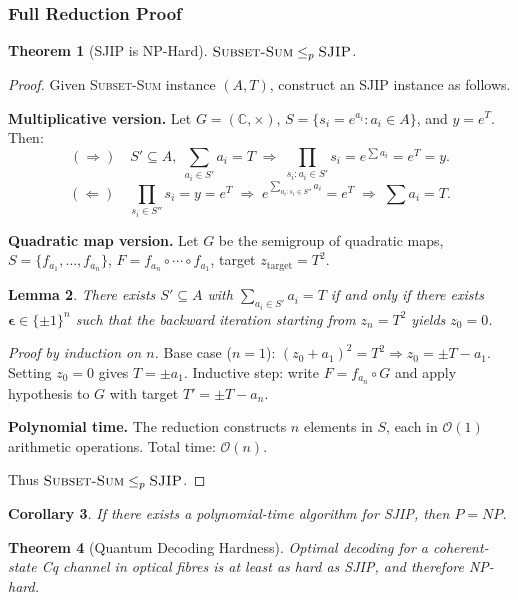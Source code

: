 \documentclass[12pt,a4paper]{article}
\theoremstyle{definition}
\theoremstyle{plain}
\newtheorem{theorem}{Theorem}[section]
\newtheorem{lemma}[theorem]{Lemma}
\newtheorem{corollary}[theorem]{Corollary}
\newcommand{\C}{\mathbb{C}}
\begin{document}
\subsubsection{Full Reduction Proof}

\begin{theorem}[SJIP is NP-Hard]
\label{thm:sjip_nphard}
$\textsc{Subset-Sum}\le_p\textsc{SJIP}$.
\end{theorem}

\begin{proof}
Given \textsc{Subset-Sum} instance $(A,T)$, construct an SJIP instance as follows.

\textbf{Multiplicative version.} Let $G=(\C,\times)$, $S=\{s_i=e^{a_i}:a_i\in A\}$,
and $y=e^T$. Then:
\[
(\Rightarrow)\quad S'\subseteq A,\;\sum_{a_i\in S'}a_i=T\;\Longrightarrow\;
\prod_{s_i:a_i\in S'}s_i=e^{\sum a_i}=e^T=y.
\]
\[
(\Leftarrow)\quad\prod_{s_i\in S''}s_i=y=e^T\;\Longrightarrow\;
e^{\sum_{a_i:s_i\in S''}a_i}=e^T\;\Longrightarrow\;\sum a_i=T.
\]

\textbf{Quadratic map version.} Let $G$ be the semigroup of quadratic maps, $S=\{f_{a_1},\dots,f_{a_n}\}$,
$F=f_{a_n}\circ\cdots\circ f_{a_1}$, target $z_{\mathrm{target}}=T^2$.

\begin{lemma}
There exists $S'\subseteq A$ with $\sum_{a_i\in S'}a_i=T$ if and only if there exists
$\boldsymbol\epsilon\in\{{\pm1}\}^n$ such that the backward iteration starting from
$z_n=T^2$ yields $z_0=0$.
\end{lemma}

\textit{Proof by induction on $n$.} Base case ($n=1$): $(z_0+a_1)^2=T^2\Rightarrow z_0=\pm T-a_1$.
Setting $z_0=0$ gives $T=\pm a_1$. Inductive step: write $F=f_{a_n}\circ G$ and apply
hypothesis to $G$ with target $T'=\pm T-a_n$.

\textbf{Polynomial time.} The reduction constructs $n$ elements in $S$, each in $\mathcal{O}(1)$
arithmetic operations. Total time: $\mathcal{O}(n)$.

Thus $\textsc{Subset-Sum}\le_p\textsc{SJIP}$.
\end{proof}

\begin{corollary}
If there exists a polynomial-time algorithm for SJIP, then $P=NP$.
\end{corollary}

\begin{theorem}[Quantum Decoding Hardness]
Optimal decoding for a coherent-state Cq channel in optical fibres is at least as hard
as SJIP, and therefore NP-hard.
\end{theorem}
\end{document}
